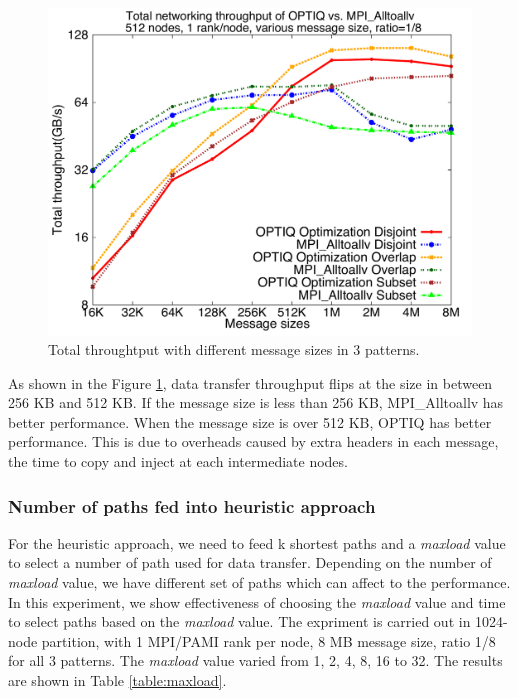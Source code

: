 \begin{figure}[!htb]
\vspace{-0.1in}
\centering
\includegraphics[scale=0.30]{figures/messagesize.pdf}
\vspace{-0.1in}
\caption{Total throughtput with different message sizes in 3 patterns.}
\vspace{-0.1in}
\label{fig:messagesize}
\end{figure}

As shown in the Figure \ref{fig:messagesize}, data transfer throughput flips at the size in between 256 KB and 512 KB. If the message size is less than 256 KB, MPI\_Alltoallv has better performance. When the message size is over 512 KB, OPTIQ has better performance. This is due to overheads caused by extra headers in each message, the time to copy and inject at each intermediate nodes.

\subsubsection{Number of paths fed into heuristic approach}

For the heuristic approach, we need to feed k shortest paths and a \textit{maxload} value to select a number of path used for data transfer. Depending on the number of \textit{maxload} value, we have different set of paths which can affect to the performance.  In this experiment, we show effectiveness of choosing the \textit{maxload} value and time to select paths based on the \textit{maxload} value. The expriment is carried out in 1024-node partition, with 1 MPI/PAMI rank per node, 8 MB message size, ratio 1/8 for all 3 patterns. The \textit{maxload} value varied from 1, 2, 4, 8, 16 to 32. The results are shown in Table \ref{table:maxload}. 

